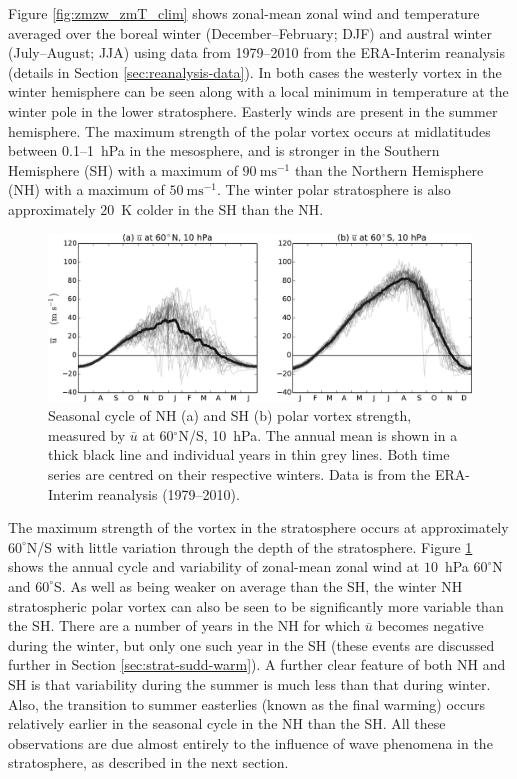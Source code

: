 Figure \ref{fig:zmzw_zmT_clim} shows zonal-mean zonal wind and temperature
averaged over the boreal winter (December--February; DJF) and austral winter
(July--August; JJA) using data from 1979--2010 from the ERA-Interim reanalysis
(details in Section \ref{sec:reanalysis-data}). In both cases the westerly
vortex in the winter hemisphere can be seen along with a local minimum in
temperature at the winter pole in the lower stratosphere. Easterly winds are
present in the summer hemisphere. The maximum strength of the polar vortex
occurs at midlatitudes between 0.1--1~hPa in the mesosphere, and is stronger in
the Southern Hemisphere (SH) with a maximum of $90~\mathrm{ms^{-1}}$ than the
Northern Hemisphere (NH) with a maximum of $50~\mathrm{ms^{-1}}$. The winter
polar stratosphere is also approximately $20$~K colder in the SH than the NH.

\begin{figure}
 \centering
 \noindent\includegraphics[width=\textwidth]{figures/chapter-intro/zmzw_NH_SH.pdf}
 \caption[Comparison of NH and SH polar vortex seasonal cycle]{Seasonal cycle
   of NH (a) and SH (b) polar vortex strength, measured by $\overline{u}$ at
   60$^{\circ}$N/S, 10~hPa. The annual mean is shown in a thick black line and
   individual years in thin grey lines. Both time series are centred on their
   respective winters. Data is from the ERA-Interim reanalysis (1979--2010).}
 \label{fig:zmzw_NH_SH}
\end{figure}

The maximum strength of the vortex in the stratosphere occurs at approximately
$60^{\circ}$N/S with little variation through the depth of the
stratosphere. Figure \ref{fig:zmzw_NH_SH} shows the annual cycle and variability
of zonal-mean zonal wind at $10$~hPa $60^{\circ}$N and $60^{\circ}$S. As well as
being weaker on average than the SH, the winter NH stratospheric polar vortex
can also be seen to be significantly more variable than the SH. There are a
number of years in the NH for which $\overline{u}$ becomes negative during the
winter, but only one such year in the SH (these events are discussed further in
Section \ref{sec:strat-sudd-warm}). A further clear feature of both NH and SH is
that variability during the summer is much less than that during winter. Also,
the transition to summer easterlies (known as the final warming) occurs
relatively earlier in the seasonal cycle in the NH than the SH. All these
observations are due almost entirely to the influence of wave phenomena in the
stratosphere, as described in the next section.


